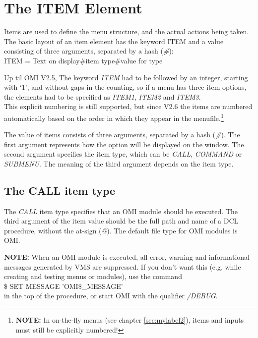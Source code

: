 \documentclass[a4paper]{book}
\newcommand{\vs}{\vspace{3mm}}
\renewcommand{\indent}{\hspace*{5mm}}
\begin{document}
\section{The ITEM Element}
\label{subsec:mylabel4}

Items are used to define the menu structure, and the actual actions being 
taken. The basic layout of an item element has the keyword ITEM and a value
consisting of three arguments, separated by a hash 
(\textsl{{\#}}): \\
\indent\textsf{ITEM = Text on display{\#}item type{\#}value for type} 

\vs

Up til OMI V2.5, The keyword \textsl{ITEM} had to be followed by an integer, starting with `1', and 
without gaps in the counting, so if a menu has three item options, the 
elements had to be specified as \textsl{ITEM1}, \textsl{ITEM2} and \textsl{ITEM3}.\\
This explicit numbering is still supported, but since V2.6 the items are numbered automatically based
on the order in which they appear in the menufile.\footnote{ \textbf{NOTE:} In on-the-fly menus (see chapter \ref{sec:mylabel2}), items and inputs must still be explicitly numbered!}

\vs

The value of items consists of three arguments, separated by a hash (\textsl{{\#}}). 
The first argument represents how the option will be displayed on the 
window. The second argument specifies the item type, which can be \textsl{CALL}, 
\textsl{COMMAND} or \textsl{SUBMENU}. The meaning of the third argument depends on the item 
type.

\subsection{The CALL item type}
\label{subsubsec:mylabel34}

The \textsl{CALL} item type specifies that an OMI 
module should be executed. The third argument of the item value should be 
the full path and name of a DCL procedure, without the at-sign (\textsl{@}). The 
default file type for OMI modules is OMI.

\vs

\hspace{-8mm}\textbf{NOTE:} When an OMI module is executed, all error, warning and 
informational messages generated by VMS are suppressed. If you don't want 
this (e.g. while creating and testing menus or modules), use the command \\
\indent\textsf{{\$} SET MESSAGE 'OMI{\$}{\_}MESSAGE'} \\
in the top of the procedure, or start OMI with the qualifier 
\textsl{/DEBUG}.
\end{document}

